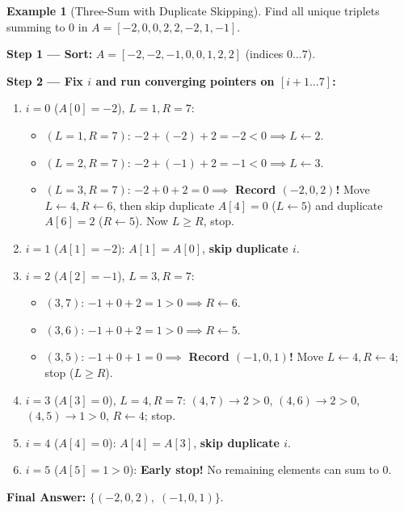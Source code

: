 \documentclass[11pt,a4paper]{article}
\theoremstyle{definition}
\newtheorem{example}{Example}[section]
\begin{document}
\begin{example}[Three-Sum with Duplicate Skipping]
Find all unique triplets summing to $0$ in $A = [-2, 0, 0, 2, 2, -2, 1, -1]$.

\textbf{Step 1 --- Sort:} $A = [-2, -2, -1, 0, 0, 1, 2, 2]$ (indices $0 \dots 7$).

\textbf{Step 2 --- Fix $i$ and run converging pointers on $[i+1 \dots 7]$:}
\begin{enumerate}[itemsep=2pt, topsep=2pt]
    \item $i = 0$ ($A[0] = -2$), $L = 1, R = 7$:
    \begin{itemize}[itemsep=1pt, topsep=1pt]
        \item $(L{=}1, R{=}7)$: $-2 + (-2) + 2 = -2 < 0 \implies L \leftarrow 2$.
        \item $(L{=}2, R{=}7)$: $-2 + (-1) + 2 = -1 < 0 \implies L \leftarrow 3$.
        \item $(L{=}3, R{=}7)$: $-2 + 0 + 2 = 0 \implies$ \textbf{Record $(-2, 0, 2)$!} Move $L \leftarrow 4, R \leftarrow 6$, then skip duplicate $A[4]{=}0$ ($L \leftarrow 5$) and duplicate $A[6]{=}2$ ($R \leftarrow 5$). Now $L \ge R$, stop.
    \end{itemize}
    \item $i = 1$ ($A[1] = -2$): $A[1] = A[0]$, \textbf{skip duplicate $i$}.
    \item $i = 2$ ($A[2] = -1$), $L = 3, R = 7$:
    \begin{itemize}[itemsep=1pt, topsep=1pt]
        \item $(3, 7)$: $-1+0+2 = 1 > 0 \implies R \leftarrow 6$.
        \item $(3, 6)$: $-1+0+2 = 1 > 0 \implies R \leftarrow 5$.
        \item $(3, 5)$: $-1+0+1 = 0 \implies$ \textbf{Record $(-1, 0, 1)$!} Move $L \leftarrow 4, R \leftarrow 4$; stop ($L \ge R$).
    \end{itemize}
    \item $i = 3$ ($A[3] = 0$), $L = 4, R = 7$: $(4, 7) \to 2 > 0$, $(4, 6) \to 2 > 0$, $(4, 5) \to 1 > 0$, $R \leftarrow 4$; stop.
    \item $i = 4$ ($A[4] = 0$): $A[4] = A[3]$, \textbf{skip duplicate $i$}.
    \item $i = 5$ ($A[5] = 1 > 0$): \textbf{Early stop!} No remaining elements can sum to $0$.
\end{enumerate}
\textbf{Final Answer:} $\{(-2, 0, 2),\; (-1, 0, 1)\}$.
\end{example}
\end{document}
